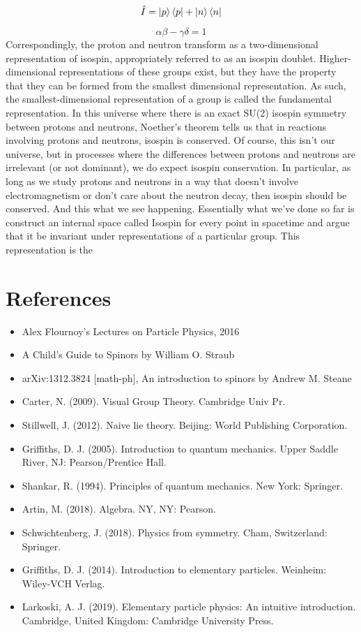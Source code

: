 \documentclass[]{article}
\begin{document}
\begin{equation}
	\hat{I} = \ket{p} \bra{p} + \ket{n} \bra{n}
\end{equation}

\begin{equation}
	\alpha \beta - \gamma \delta = 1
\end{equation}
Correspondingly, the proton and neutron transform as a two-dimensional representation of isospin, appropriately referred to as an isospin doublet. Higher-dimensional representations of these groups exist, but they have the property that they can be formed from the smallest dimensional representation. As such, the smallest-dimensional representation of a group is called the fundamental representation.
In this universe where there is an exact SU(2) isospin symmetry between protons and neutrons, Noether’s theorem tells us that in reactions involving protons and neutrons, isospin is conserved. Of course, this isn’t our universe, but in processes where the differences between protons and neutrons are irrelevant (or not dominant), we do expect isospin conservation. In particular,
as long as we study protons and neutrons in a way that doesn’t involve electromagnetism or don’t care about the neutron decay, then isospin should be conserved. And this what we see happening. Essentially what we've done so far is construct an internal space called Isospin for every point in spacetime and argue that it be invariant under representations of a particular group. This representation is the 
\section*{References}
\begin{itemize}
\item Alex Flournoy's Lectures on Particle Physics, 2016
\item A Child’s Guide to Spinors by William O. Straub
\item arXiv:1312.3824 [math-ph], An introduction to spinors by Andrew M. Steane 
\item Carter, N. (2009). Visual Group Theory. Cambridge Univ Pr.
\item Stillwell, J. (2012). Naive lie theory. Beijing: World Publishing Corporation.
\item Griffiths, D. J. (2005). Introduction to quantum mechanics. Upper Saddle River, NJ: Pearson/Prentice Hall.
\item Shankar, R. (1994). Principles of quantum mechanics. New York: Springer.
\item Artin, M. (2018). Algebra. NY, NY: Pearson.
\item Schwichtenberg, J. (2018). Physics from symmetry. Cham, Switzerland: Springer.
\item Griffiths, D. J. (2014). Introduction to elementary particles. Weinheim: Wiley-VCH Verlag.
\item Larkoski, A. J. (2019). Elementary particle physics: An intuitive introduction. Cambridge, United Kingdom: Cambridge University Press.
\end{itemize}
\end{document}

